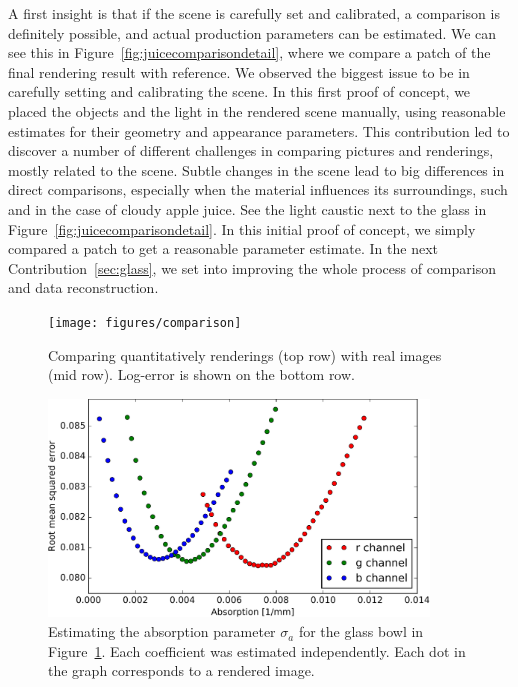 A first insight is that if the scene is carefully set and calibrated, a comparison is definitely possible, and actual production parameters can be estimated. We can see this in Figure~\ref{fig:juicecomparisondetail}, where we compare a patch of the final rendering result with reference. We observed the biggest issue to be in carefully setting and calibrating the scene. In this first proof of concept, we placed the objects and the light in the rendered scene manually, using reasonable estimates for their geometry and appearance parameters. This contribution led to discover a number of different challenges in comparing pictures and renderings, mostly related to the scene. Subtle changes in the scene lead to big differences in direct comparisons, especially when the material influences its surroundings, such and in the case of cloudy apple juice. See the light caustic next to the glass in Figure~\ref{fig:juicecomparisondetail}. In this initial proof of concept, we simply compared a patch to get a reasonable parameter estimate. In the next Contribution~\ref{sec:glass}, we set into improving the whole process of comparison and data reconstruction.

\begin{figure}
\centering
 \texttt{[image: figures/comparison]} 
\caption{Comparing quantitatively renderings (top row) with real images (mid row). Log-error is shown on the bottom row.}
\label{fig:glasscomparison}
\end{figure}

\begin{figure}
\centering
\includegraphics[width=0.9\textwidth]{figures/glass_bowl_analysis_by_synthesis}  \caption{Estimating the absorption parameter $\sigma_a$ for the glass bowl in Figure~\ref{fig:glasscomparison}. Each coefficient was estimated independently. Each dot in the graph corresponds to a rendered image. }
\label{fig:glasscomparisongraph}
\end{figure}

